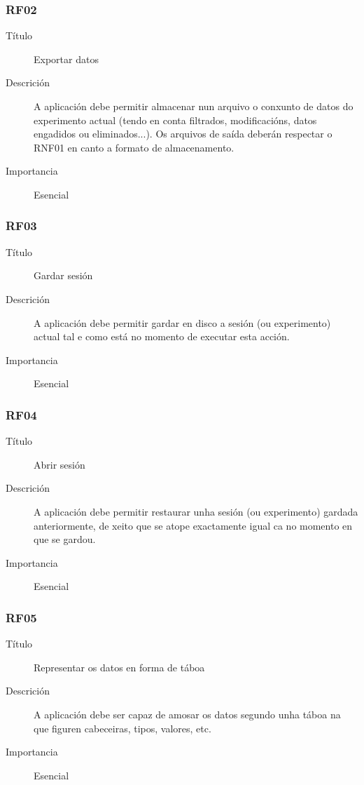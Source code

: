 \subsubsection*{RF02}
\begin{description}
\item[Título] \hfill
Exportar datos
\item[Descrición] \hfill
A aplicación debe permitir almacenar nun arquivo o conxunto de datos do experimento actual (tendo en conta filtrados, modificacións, datos engadidos ou eliminados...). Os arquivos de saída deberán respectar o RNF01 en canto a formato de almacenamento.
\item[Importancia] \hfill
Esencial
\end{description}

\subsubsection*{RF03}
\begin{description}
\item[Título] \hfill
Gardar sesión
\item[Descrición] \hfill
A aplicación debe permitir gardar en disco a sesión (ou experimento) actual tal e como está no momento de executar esta acción.
\item[Importancia] \hfill
Esencial
\end{description}

\subsubsection*{RF04}
\begin{description}
\item[Título] \hfill
Abrir sesión
\item[Descrición] \hfill
A aplicación debe permitir restaurar unha sesión (ou experimento) gardada anteriormente, de xeito que se atope exactamente igual ca no momento en que se gardou.
\item[Importancia] \hfill
Esencial
\end{description}

\subsubsection*{RF05}
\begin{description}
\item[Título] \hfill
Representar os datos en forma de táboa
\item[Descrición] \hfill
A aplicación debe ser capaz de amosar os datos segundo unha táboa na que figuren cabeceiras, tipos, valores, etc.
\item[Importancia] \hfill
Esencial
\end{description}

